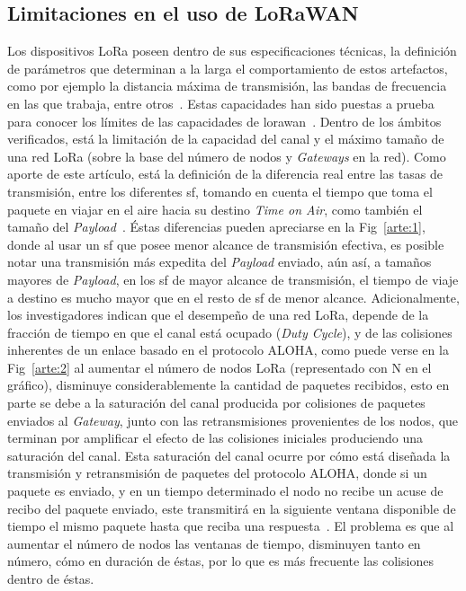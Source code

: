 \begin{justify}
\section{Limitaciones en el uso de LoRaWAN}
Los dispositivos LoRa poseen dentro de sus especificaciones técnicas, la definición de parámetros que determinan a la larga el comportamiento de estos artefactos, como por ejemplo la distancia máxima de transmisión, las bandas de frecuencia en las que trabaja, entre otros~\cite{orange}. Estas capacidades han sido puestas a prueba para conocer los límites de las capacidades de \gls{lorawan}~\cite{Xavier}. Dentro de los ámbitos verificados, está la limitación de la capacidad del canal y el máximo tamaño de una red LoRa (sobre la base del número de nodos y \textit{Gateways} en la red). Como aporte de este artículo, está la definición de la diferencia real entre las tasas de transmisión, entre los diferentes \gls{sf}, tomando en cuenta el tiempo que toma el paquete en viajar en el aire hacia su destino \textit{Time on Air}, como también el tamaño del \textit{Payload}~\cite{Xavier}. Éstas diferencias pueden apreciarse en la Fig~\ref{arte:1}, donde al usar un \gls{sf} que posee menor alcance de transmisión efectiva, es posible notar una transmisión más expedita del \textit{Payload} enviado, aún así, a tamaños mayores de \textit{Payload}, en los \gls{sf} de mayor alcance de transmisión, el tiempo de viaje a destino es mucho mayor que en el resto de \gls{sf} de menor alcance. Adicionalmente, los investigadores indican que el desempeño de una red LoRa, depende de la fracción de tiempo en que el canal está ocupado (\textit{Duty Cycle}), y de las colisiones inherentes de un enlace basado en el protocolo ALOHA, como puede verse en la Fig~\ref{arte:2} al aumentar el número de nodos LoRa (representado con N en el gráfico), disminuye considerablemente la cantidad de paquetes recibidos, esto en parte se debe a la saturación del canal producida por colisiones de paquetes enviados al \textit{Gateway}, junto con las retransmisiones provenientes de los nodos, que terminan por amplificar el efecto de las colisiones iniciales produciendo una saturación del canal. Esta saturación del canal ocurre por cómo está diseñada la transmisión y retransmisión de paquetes del protocolo ALOHA, donde si un paquete es enviado, y en un tiempo determinado el nodo no recibe un acuse de recibo del paquete enviado, este transmitirá en la siguiente ventana disponible de tiempo el mismo paquete hasta que reciba una respuesta~\cite{NORMAN}. El problema es que al aumentar el número de nodos las ventanas de tiempo, disminuyen tanto en número, cómo en duración de éstas, por lo que es más frecuente las colisiones dentro de éstas.\\

\end{justify}
